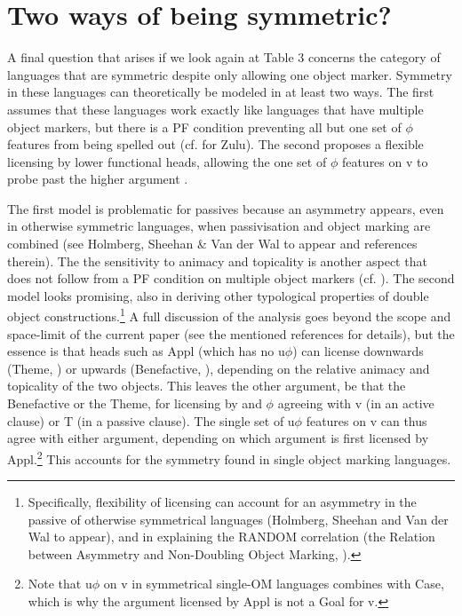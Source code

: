 \documentclass[output=paper
,modfonts
,nonflat]{langsci/langscibook}
\begin{document}
\section{Two ways of being symmetric?}

A final question that arises if we look again at Table 3 concerns the category of languages that are symmetric despite only allowing one object marker. Symmetry in these languages can theoretically be modeled in at least two ways. The first assumes that these languages work exactly like languages that have multiple object markers, but there is a PF condition preventing all but one set of $\phi$ features from being spelled out (cf. \citealt{Adams2010} for Zulu). The second proposes a flexible licensing by lower functional heads, allowing the one set of $\phi$ features on v to probe past the higher argument \citep{Haddican_Holmberg,2012,2015,Van_der_Wal2017a, HolmbergEtAlto appear}. 

The first model is problematic for passives because an asymmetry appears, even in otherwise symmetric languages, when passivisation and object marking are combined (see Holmberg, Sheehan \& Van der Wal to appear and references therein). The the sensitivity to animacy and topicality is another aspect that does not follow from a PF condition on multiple object markers (cf. \citealt{Zeller2012}). The second model looks promising, also in deriving other typological properties of double object constructions.\footnote{Specifically, flexibility of licensing can account for an asymmetry in the passive of otherwise symmetrical languages (Holmberg, Sheehan and Van der Wal to appear), and in explaining the RANDOM correlation (the Relation between Asymmetry and Non-Doubling Object Marking, \citealt{Van_der_Wal2017b}).} A full discussion of the analysis goes beyond the scope and space-limit of the current paper (see the mentioned references for details), but the essence is that heads such as Appl (which has no u$\phi$) can license downwards (Theme, ) or upwards (Benefactive, ), depending on the relative animacy and topicality of the two objects. This leaves the other argument, be that the Benefactive or the Theme, for licensing by and $\phi$ agreeing with v (in an active clause) or T (in a passive clause). The single set of u$\phi$ features on v can thus agree with either argument, depending on which argument is first licensed by Appl.\footnote{Note that u$\phi$ on v in symmetrical single-OM languages combines with Case, which is why the argument licensed by Appl is not a Goal for v.} This accounts for the symmetry found in single object marking languages.
\end{document}
